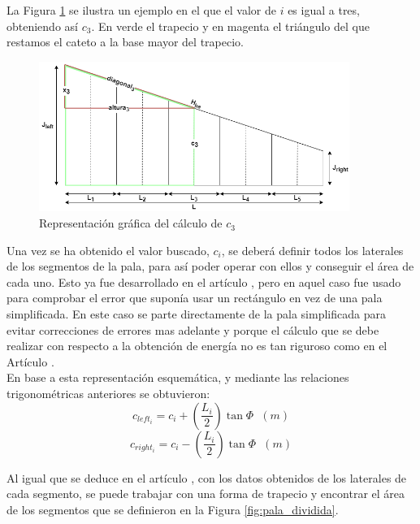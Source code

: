 La Figura \ref{fig:sacar_c3} se ilustra un ejemplo en el que  el valor de $i$ es igual a tres, obteniendo así $c_3$. En verde el trapecio y en magenta el triángulo del que restamos el cateto a la base mayor del trapecio.\\

\begin{figure}[H]
    \centering
    \includegraphics[width=0.9\textwidth]{images/Trapecio calculo x.png}
    \caption{Representación gráfica del cálculo de $c_3$} 
    \label{fig:sacar_c3}
\end{figure}


Una vez se ha obtenido el valor buscado, $c_i$, se deberá definir todos los laterales de los segmentos de la pala, para así poder operar con ellos y conseguir el área de cada uno. Esto ya fue desarrollado en el artículo \cite{armenta2021predictive}, pero en aquel caso fue usado para comprobar el error que suponía usar un rectángulo en vez de una pala simplificada. En este caso se parte directamente de la pala simplificada para evitar correcciones de errores mas adelante y porque el cálculo que se debe realizar con respecto a la obtención de energía no es tan riguroso como en el Artículo \cite{armenta2021predictive}.\\

En base a esta representación esquemática, y mediante las relaciones trigonométricas anteriores se obtuvieron:
\begin{equation}
 c_{left_i} = c_i + (\dfrac{L_i}{2}) \tan \varPhi \hspace{7pt} (m)
 \label{def:laterales_segmento_left}
\end{equation}
\begin{equation}
 c_{right_i} = c_i - (\dfrac{L_i}{2}) \tan \varPhi \hspace{7pt} (m)
\label{def:laterales_segmento_right}
\end{equation}

Al igual que se deduce en el artículo \cite{armenta2021predictive}, con los datos obtenidos de los laterales de cada segmento, se puede trabajar con una forma de trapecio y encontrar el área de los segmentos que se definieron en la Figura \ref{fig:pala_dividida}.\\

